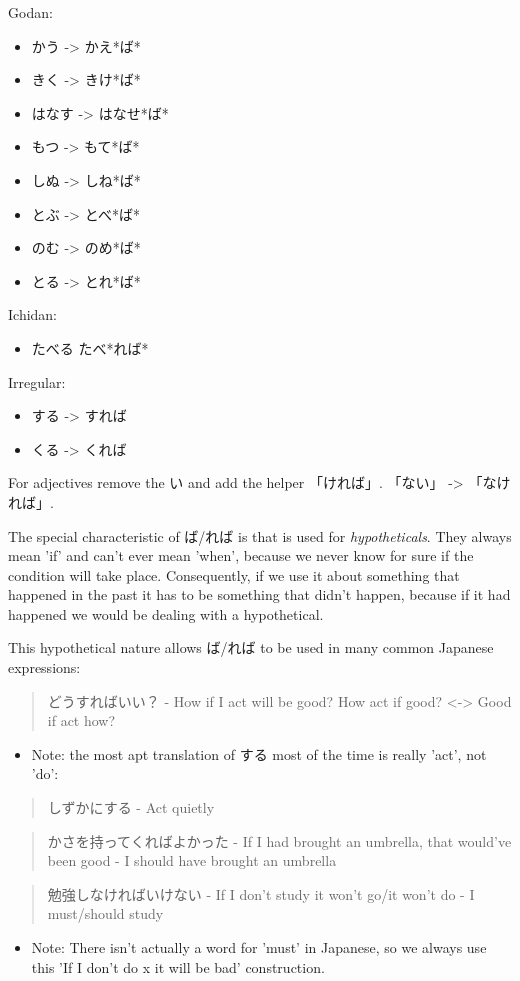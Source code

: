 \documentclass[11pt]{article}
\begin{document}
Godan:
\begin{itemize}
\item かう -> かえ*ば*
\item きく -> きけ*ば*
\item はなす -> はなせ*ば*
\item もつ ->  もて*ば*
\item しぬ ->  しね*ば*
\item とぶ ->  とべ*ば*
\item のむ ->  のめ*ば*
\item とる ->  とれ*ば*
\end{itemize}
Ichidan:
\begin{itemize}
\item たべる たべ*れば*
\end{itemize}
Irregular:
\begin{itemize}
\item する -> すれば
\item くる -> くれば
\end{itemize}

For adjectives remove the い and add the helper 「ければ」. 「ない」 -> 「なければ」.

The special characteristic of ば/れば is that is used for \emph{hypotheticals}. They always mean 'if' and can't ever mean 'when', because we never know for sure if the condition will take place. Consequently, if we use it about something that happened in the past it has to be something that didn't happen, because if it had happened we would be dealing with a hypothetical.

This hypothetical nature allows ば/れば to be used in many common Japanese expressions:
\begin{quote}
どうすればいい？ - How if I act will be good? How act if good? <-> Good if act how?
\end{quote}
\begin{itemize}
\item Note: the most apt translation of する most of the time is really 'act', not 'do':
\end{itemize}
\begin{quote}
しずかにする - Act quietly
\end{quote}

\begin{quote}
かさを持ってくればよかった - If I had brought an umbrella, that would've been good - I should have brought an umbrella
\end{quote}

\begin{quote}
勉強しなければいけない - If I don't study it won't go/it won't do - I must/should study
\end{quote}
\begin{itemize}
\item Note: There isn't actually a word for 'must' in Japanese, so we always use this 'If I don't do x it will be bad' construction.
\end{itemize}
\end{document}
